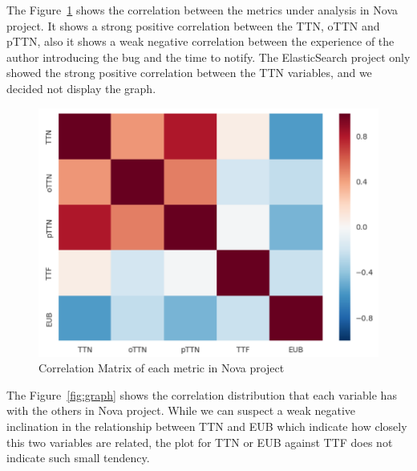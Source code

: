 \documentclass[10pt, conference]{IEEEtran}
\begin{document}
The Figure~\ref{fig:correlation} shows the correlation between the metrics under analysis in Nova project. It shows a strong positive correlation between the TTN, oTTN and pTTN, also it shows a weak negative correlation between the experience of the author introducing the bug and the time to notify. The ElasticSearch project only showed the strong positive correlation between the TTN variables, and we decided not display the graph.

\begin{figure}[ht]
\centering
\includegraphics[width=\columnwidth]{correlationMatrix.png}
\caption{Correlation Matrix of each metric in Nova project}
\label{fig:correlation}       %
\end{figure}

The Figure~\ref{fig:graph} shows the correlation distribution that each variable has with the others in Nova project. While we can suspect a weak negative inclination in the relationship between TTN and EUB which indicate how closely this two variables are related, the plot for TTN or EUB against TTF does not indicate such small tendency.
\end{document}
